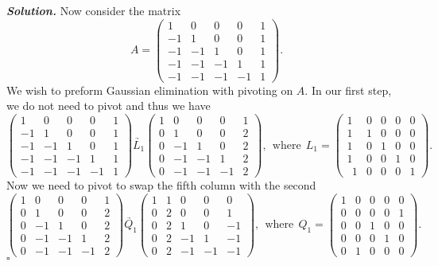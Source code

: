 \documentclass[12pt]{report}
\newenvironment{solution}[1][\it{Solution}]{\textbf{#1. } }{$\square$}
\begin{document}
\begin{solution}
    \noindent
    Now consider the matrix
    \[ 
        A = \begin{pmatrix}1&0&0&0&1\\ -1&1&0&0&1\\ -1&-1&1&0&1\\-1&-1&-1&1&1\\ -1&-1&-1&-1&1\end{pmatrix}.
    \]
    We wish to preform Gaussian elimination with pivoting on $A$. In our first step, we do not need to pivot and thus we have
    \[ 
        \begin{pmatrix}1&0&0&0&1\\ -1&1&0&0&1\\ -1&-1&1&0&1\\-1&-1&-1&1&1\\ -1&-1&-1&-1&1\end{pmatrix} \underrightarrow{L_1} \begin{pmatrix}1&0&0&0&1\\ 0&1&0&0&2\\ 0&-1&1&0&2\\ 0&-1&-1&1&2\\ 0&-1&-1&-1&2\end{pmatrix}, ~~ \text{where} ~~ L_1 = \begin{pmatrix}1&0&0&0&0\\ 1&1&0&0&0\\ 1&0&1&0&0\\ 1&0&0&1&0\\ \:\:1&0&0&0&1\end{pmatrix}.
    \] 
    Now we need to pivot to swap the fifth column with the second
    \[
        \begin{pmatrix}1&0&0&0&1\\ 0&1&0&0&2\\ 0&-1&1&0&2\\ 0&-1&-1&1&2\\ 0&-1&-1&-1&2\end{pmatrix} \underrightarrow{Q_1} \begin{pmatrix}1&1&0&0&0\\ 0&2&0&0&1\\ 0&2&1&0&-1\\ 0&2&-1&1&-1\\ 0&2&-1&-1&-1\end{pmatrix}, ~~ \text{where}~~ Q_1 = \begin{pmatrix}1&0&0&0&0\\ 0&0&0&0&1\\ 0&0&1&0&0\\ 0&0&0&1&0\\ 0&1&0&0&0\end{pmatrix}.
\]
\end{solution}
\end{document}
